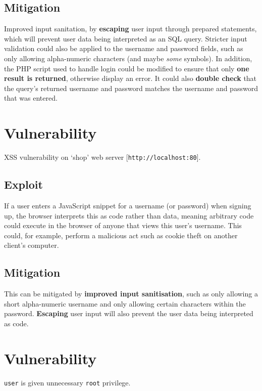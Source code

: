 \documentclass[11pt]{article}
\begin{document}
\subsection{Mitigation}

Improved input sanitation, by \textbf{escaping} user input through prepared statements, which will prevent user data being interpreted as an SQL query. Stricter input validation could also be applied to the username and password fields, such as only allowing alpha-numeric characters (and maybe \textit{some} symbols). In addition, the PHP script used to handle login could be modified to ensure that only \textbf{one result is returned}, otherwise display an error. It could also \textbf{double check} that the query's returned username and password matches the username and password that was entered.

\section{Vulnerability}

XSS vulnerability on `shop' web server [\texttt{http://localhost:80}].

\subsection{Exploit}

If a user enters a JavaScript snippet for a username (or password) when signing up, the browser interprets this as code rather than data, meaning arbitrary code could execute in the browser of anyone that views this user's username. This could, for example, perform a malicious act such as cookie theft on another client's computer.

\subsection{Mitigation}

This can be mitigated by \textbf{improved input sanitisation}, such as only allowing a short alpha-numeric username and only allowing certain characters within the password. \textbf{Escaping} user input will also prevent the user data being interpreted as code.

\section{Vulnerability}

\texttt{user} is given unnecessary \texttt{root} privilege.
\end{document}
